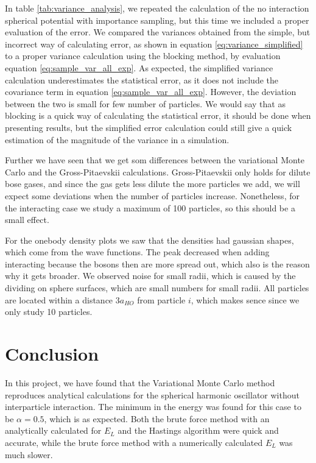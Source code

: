 \documentclass[norsk,a4paper,12pt]{article}
\begin{document}
In table \ref{tab:variance_analysis}, we repeated the calculation of the no interaction spherical potential with importance sampling, but this time we included a proper evaluation of the error. We compared the variances obtained from the simple, but incorrect way of calculating error, as shown in equation \ref{eq:variance_simplified} to a proper variance calculation using the blocking method, by evaluation equation \ref{eq:sample_var_all_exp}. As expected, the simplified variance calculation underestimates the statistical error, as it does not include the covariance term in equation \ref{eq:sample_var_all_exp}. However, the deviation between the two is small for few number of particles. We would say that as blocking is a quick way of calculating the statistical error, it should be done when presenting results, but the simplified error calculation could still give a quick estimation of the magnitude of the variance in a simulation.
\par 
\vspace{6mm}


Further we have seen that we get som differences between the variational Monte Carlo and the Gross-Pitaevskii calculations. Gross-Pitaevskii only holds for dilute bose gases, and since the gas gets less dilute the more particles we add, we will expect some deviations when the number of particles increase. Nonetheless, for the interacting case we study a maximum of 100 particles, so this should be a small effect.
\par 
\vspace{3mm}

For the onebody density plots we saw that the densities had gaussian shapes, which come from the wave functions. The peak decreased when adding interacting because the bosons then are more spread out, which also is the reason why it gets broader. We observed noise for small radii, which is caused by the dividing on sphere surfaces, which are small numbers for small radii. All particles are located within a distance $3a_{HO}$ from particle $i$, which makes sence since we only study 10 particles. 


\section{Conclusion}

In this project, we have found that the Variational Monte Carlo method reproduces analytical calculations for the spherical harmonic oscillator without interparticle interaction. The minimum in the energy was found for this case to be $\alpha=0.5$, which is as expected. Both the brute force method with an analytically calculated for $E_L$ and the Hastings algorithm were quick and accurate, while the brute force method with a numerically calculated $E_L$ was much slower.
\end{document}
